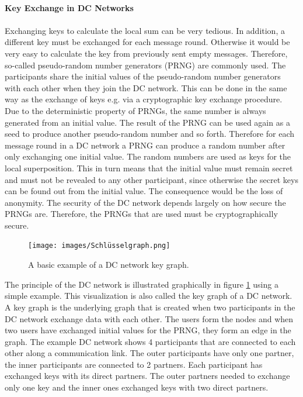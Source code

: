 \\
\textbf{Key Exchange in DC Networks}
\\
\\
Exchanging keys to calculate the local sum can be very tedious. In addition, a different key must be exchanged for each message round. Otherwise it would be very easy to calculate the key from previously sent empty messages. Therefore, so-called pseudo-random number generators (PRNG) are commonly used. The participants share the initial values of the pseudo-random number generators with each other when they join the DC network. This can be done in the same way as the exchange of keys e.g. via a cryptographic key exchange procedure. Due to the deterministic property of PRNGs, the same number is always generated from an initial value. The result of the PRNG can be used again as a seed to produce another pseudo-random number and so forth. Therefore for each message round in a DC network a PRNG can produce a random number after only exchanging one initial value. The random numbers are used as keys for the local superposition. This in turn means that the initial value must remain secret and must not be revealed to any other participant, since otherwise the secret keys can be found out from the initial value. The consequence would be the loss of anonymity. The security of the DC network depends largely on how secure the PRNGs are. Therefore, the PRNGs that are used must be cryptographically secure.\\
\begin{figure}[tbp]
  \centering
  \texttt{[image: images/Schlüsselgraph.png]}
  \caption[DC Network Key Graph]{A basic example of a DC network key graph.}
  \label{fig:keygraph}
\end{figure}
The principle of the DC network is illustrated graphically in figure \ref{fig:keygraph} using a simple example. This visualization is also called the key graph of a DC network. A key graph is the underlying graph that is created when two participants in the DC network exchange data with each other. The users form the nodes and when two users have exchanged initial values for the PRNG, they form an edge in the graph. The example DC network shows 4 participants that are connected to each other along a communication link. The outer participants have only one partner, the inner participants are connected to 2 partners. Each participant has exchanged keys with its direct partners. The outer partners needed to exchange only one key and the inner ones exchanged keys with two direct partners.
